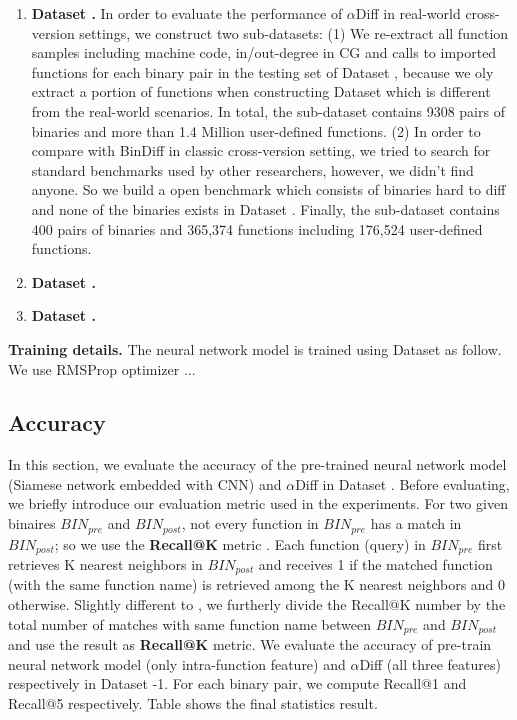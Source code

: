 \documentclass[10pt,conference]{IEEEtran}
\begin{document}
\begin{enumerate}
\item \textbf{Dataset \uppercase\expandafter{}.}
In order to evaluate the performance of $\alpha$Diff in real-world cross-version settings, we construct two sub-datasets:
 (1) We re-extract all function samples including machine code, in/out-degree in CG and calls to imported functions for each binary pair in the testing set of Dataset \uppercase\expandafter{},
 because we oly extract a portion of functions when constructing Dataset \uppercase\expandafter{} which is different from the real-world scenarios. 
 In total, the sub-dataset contains 9308 pairs of binaries and more than 1.4 Million user-defined functions.
 (2) In order to compare with BinDiff in classic cross-version setting, we tried to search for standard benchmarks used by other researchers, however,
  we didn't find anyone. So we build a open benchmark which consists of binaries hard to diff and none of the binaries exists in Dataset \uppercase\expandafter{}.
  Finally, the sub-dataset contains 400 pairs of binaries and 365,374 functions including 176,524 user-defined functions.

\item \textbf{Dataset \uppercase\expandafter{}.}

\item \textbf{Dataset \uppercase\expandafter{}.}

\end{enumerate}

\textbf{Training details.} The neural network model is trained using Dataset \uppercase\expandafter{} as follow. 
We use RMSProp optimizer ...

\subsection{Accuracy}
In this section, we evaluate the accuracy of the pre-trained neural network model (Siamese network embedded with CNN) and $\alpha$Diff in Dataset \uppercase\expandafter{}.
Before evaluating, we briefly introduce our evaluation metric used in the experiments. 
For two given binaires $BIN_{pre}$ and $BIN_{post}$, not every function in $BIN_{pre}$ has a match in $BIN_{post}$; 
so we use the \textbf{Recall@K} metric \cite{jegou2011product}\cite{song2016deep}. 
Each function (query) in $BIN_{pre}$ first retrieves K nearest neighbors in $BIN_{post}$ and receives 1 if the matched function (with the same function name) is retrieved among the K nearest
 neighbors and 0 otherwise. 
Slightly different to \cite{jegou2011product}\cite{song2016deep}, we furtherly divide the Recall@K number by the total number of matches with same function name between $BIN_{pre}$ and $BIN_{post}$
 and use the result as \textbf{Recall@K} metric.
We evaluate the accuracy of pre-train neural network model (only intra-function feature) and $\alpha$Diff (all three features) respectively in Dataset \uppercase\expandafter{}-1.
 For each binary pair, we compute Recall@1 and Recall@5 respectively. Table \uppercase\expandafter{} shows the final statistics result.
\end{document}
